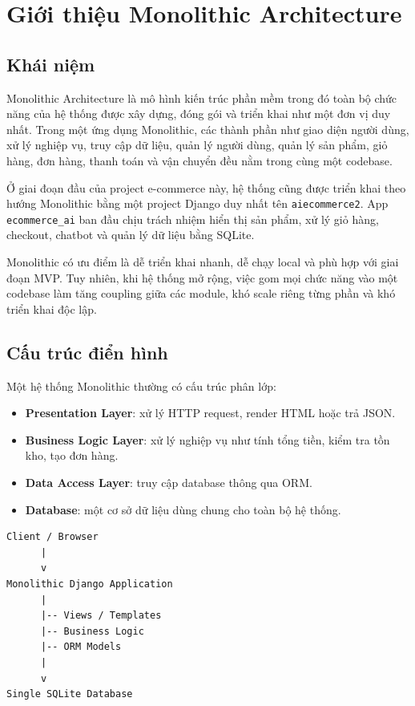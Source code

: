 \documentclass[12pt,a4paper]{report}
\begin{document}
\section{Giới thiệu Monolithic Architecture}

\subsection{Khái niệm}

Monolithic Architecture là mô hình kiến trúc phần mềm trong đó toàn bộ chức năng của hệ thống được xây dựng, đóng gói và triển khai như một đơn vị duy nhất. Trong một ứng dụng Monolithic, các thành phần như giao diện người dùng, xử lý nghiệp vụ, truy cập dữ liệu, quản lý người dùng, quản lý sản phẩm, giỏ hàng, đơn hàng, thanh toán và vận chuyển đều nằm trong cùng một codebase.

Ở giai đoạn đầu của project e-commerce này, hệ thống cũng được triển khai theo hướng Monolithic bằng một project Django duy nhất tên \texttt{aiecommerce2}. App \texttt{ecommerce\_ai} ban đầu chịu trách nhiệm hiển thị sản phẩm, xử lý giỏ hàng, checkout, chatbot và quản lý dữ liệu bằng SQLite.

Monolithic có ưu điểm là dễ triển khai nhanh, dễ chạy local và phù hợp với giai đoạn MVP. Tuy nhiên, khi hệ thống mở rộng, việc gom mọi chức năng vào một codebase làm tăng coupling giữa các module, khó scale riêng từng phần và khó triển khai độc lập.

\subsection{Cấu trúc điển hình}

Một hệ thống Monolithic thường có cấu trúc phân lớp:

\begin{itemize}
  \item \textbf{Presentation Layer}: xử lý HTTP request, render HTML hoặc trả JSON.
  \item \textbf{Business Logic Layer}: xử lý nghiệp vụ như tính tổng tiền, kiểm tra tồn kho, tạo đơn hàng.
  \item \textbf{Data Access Layer}: truy cập database thông qua ORM.
  \item \textbf{Database}: một cơ sở dữ liệu dùng chung cho toàn bộ hệ thống.
\end{itemize}

\begin{verbatim}
Client / Browser
      |
      v
Monolithic Django Application
      |
      |-- Views / Templates
      |-- Business Logic
      |-- ORM Models
      |
      v
Single SQLite Database
\end{verbatim}
\end{document}
